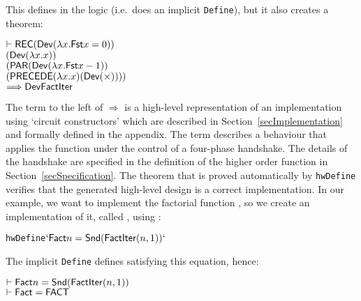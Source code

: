 \documentclass{llncs}
\begin{document}
\vspace*{-2mm}

\noindent This defines  in the logic (i.e.~does an
implicit \texttt{Define}), but it also creates a theorem:

\vspace*{-2mm}

{\baselineskip10pt\begin{alltt}
\( \vdash \DEF{REC} (\DEF{Dev} ({\lambda}x. \DEF{Fst} x = 0))         \) 
\(        (\DEF{Dev} ({\lambda}x. x))                                 \)
\(        (\DEF{PAR} (\DEF{Dev} ({\lambda}x. \DEF{Fst} x - 1))        \)
\(             (\DEF{PRECEDE} ({\lambda}x. x) (\DEF{Dev}({\times})))) \)
\(    \Longrightarrow \DEF{Dev} \DEF{FactIter}                        \)
\end{alltt}}

\vspace*{-2mm}

\noindent The term to the left of $\Longrightarrow$ is a high-level
representation of an implementation using `circuit constructors' which
are described in Section~\ref{secImplementation} and formally defined in the
appendix.  The term  describes a behaviour that
applies the function  under the control of a four-phase
handshake. The details of the handshake are specified in the
definition of the higher order function  in
Section~\ref{secSpecification}. The theorem that is proved
automatically by
\texttt{hwDefine} verifies that the generated high-level design is a correct
implementation. In our example, we want to implement the factorial
function , so we create an implementation of it, called
, using :

\vspace*{-2mm}

{\baselineskip10pt\begin{alltt}
 hwDefine\( `\DEF{Fact} n = \DEF{Snd}(\DEF{FactIter} (n,1))`  \)
\end{alltt}}

\vspace*{-2mm}

\noindent The implicit \texttt{Define} defines  satisfying this equation, hence:

\vspace*{-2mm}

{\baselineskip14pt\begin{alltt}
\( \vdash \DEF{Fact} n = \DEF{Snd}(\DEF{FactIter}(n,1)) \)
\( \vdash \DEF{Fact} = \DEF{FACT}                       \)
\end{alltt}}
\end{document}
